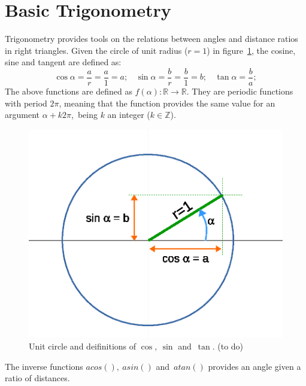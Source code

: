
\section{Basic Trigonometry}
Trigonometry provides tools on the relations between angles and distance ratios in right triangles. 
Given the circle of unit radius ($r=1$) in figure~\ref{fig:trigonometry}, the cosine, sine and tangent are defined as: 
\begin{equation}
 \cos \alpha = \frac{a}{r} = \frac{a}{1} = a; \ \ \ \ 
 \sin \alpha = \frac{b}{r} = \frac{b}{1} = b; \ \ \ \ 
 \tan \alpha = \frac{b}{a};
\end{equation}
The above functions are defined as $f(\alpha):\mathbb{R} \rightarrow \mathbb{R}$. They are periodic functions with period $2\pi$, meaning that the function provides the same value for an argument $\alpha+k2\pi$,~being $k$ an integer ($k \in \mathbb{Z}$). 
\begin{figure}[bth!]
  \begin{center}
    \includegraphics[width=1.0\columnwidth]{figures/trigonometry.eps}
    \caption{Unit circle and deifinitions of $\cos,\ \sin$ and~$\tan$. (to do)}
    \label{fig:trigonometry}
  \end{center}
\end{figure}

The inverse functions $acos(),\ asin()$ and~$atan()$ provides an angle given a ratio of distances. 

